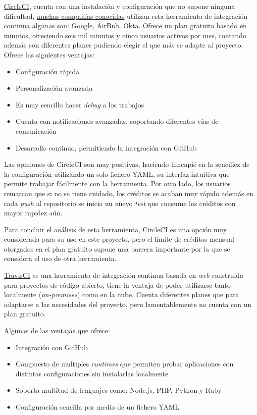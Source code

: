 \href{https://circleci.com/}{CircleCI}, cuenta con una instalación y configuración que no supone ninguna dificultad, \href{https://circleci.com/customers/}{muchas compañías conocidas} utilizan esta herramienta de integración continua algunas son: \href{https://www.google.com/}{Google}, \href{https://www.airbnb.es/}{AirBnb}, \href{https://www.okta.com/}{Okta}. Ofrece un plan gratuito basado en minutos, ofreciendo seis mil minutos y cinco usuarios activos por mes, contando además con diferentes planes pudiendo elegir el que más se adapte al proyecto. Ofrece las siguientes ventajas: \cite{polkhovskiy2016comparison}
\begin{itemize}
    \item Configuración rápida
    \item Personalización avanzada
    \item Es muy sencillo hacer \emph{debug} a los trabajos
    \item Cuenta con notificaciones avanzadas, soportando diferentes vías de comunicación
    \item Desarrollo continuo, permitiendo la integración con GitHub
\end{itemize}

Las opiniones de CircleCI son muy positivas, haciendo hincapié en la sencillez de la configuración utilizando un solo fichero YAML, su interfaz intuitiva que permite trabajar fácilmente con la herramienta. Por otro lado, los usuarios remarcan que si no se tiene cuidado, los créditos se acaban muy rápido además en cada \emph{push} al repositorio se inicia un nuevo \emph{test} que consume los créditos con mayor rapidez aún. \cite{CircleCI2023}

Para concluir el análisis de esta herramienta, CircleCI es una opción muy considerada para su uso en este proyecto, pero el límite de créditos mensual otorgados en el plan gratuito supone una barrera importante por la que se considera el uso de otra herramienta.

\href{https://www.travis-ci.com/}{TravisCI} es una herramienta de integración continua basada en \emph{web} construida para proyectos de código abierto, tiene la ventaja de poder utilizarse tanto localmente (\emph{on-premises}) como en la nube. Cuenta diferentes planes que para adaptarse a las necesidades del proyecto, pero lamentablemente no cuenta con un plan gratuito. 

Algunas de las ventajas que ofrece: \cite{}
\begin{itemize}
    \item Integración con GitHub
    \item Compuesto de multiples \emph{runtimes} que permiten probar aplicaciones con distintas configuraciones sin instalarlas localmente
    \item Soporta multitud de lenguajes como: Node.js, PHP, Python y Ruby
    \item Configuración sencilla por medio de un fichero YAML
\end{itemize}


